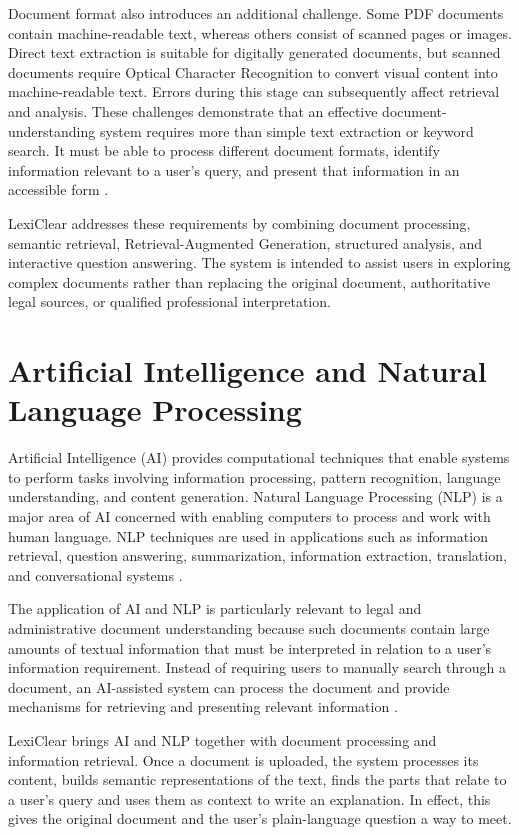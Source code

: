 \documentclass[12pt,a4paper,oneside]{report}
\begin{document}
Document format also introduces an additional challenge. Some PDF documents
contain machine-readable text, whereas others consist of scanned pages or
images. Direct text extraction is suitable for digitally generated
documents, but scanned documents require Optical Character Recognition to
convert visual content into machine-readable text. Errors during this stage
can subsequently affect retrieval and analysis. These challenges demonstrate that an effective document-understanding system
requires more than simple text extraction or keyword search. It must be able
to process different document formats, identify information relevant to a
user's query, and present that information in an accessible form \cite{pramanik2025}.

LexiClear addresses these requirements by combining document processing,
semantic retrieval, Retrieval-Augmented Generation, structured analysis, and
interactive question answering. The system is intended to assist users in exploring complex
documents rather than replacing the original document, authoritative legal
sources, or qualified professional interpretation.

\section{Artificial Intelligence and Natural Language Processing}

Artificial Intelligence (AI) provides computational techniques that enable
systems to perform tasks involving information processing, pattern
recognition, language understanding, and content generation. Natural Language
Processing (NLP) is a major area of AI concerned with enabling computers to
process and work with human language. NLP techniques are used in applications
such as information retrieval, question answering, summarization,
information extraction, translation, and conversational systems \cite{bommarito2018lexnlp}.

The application of AI and NLP is particularly relevant to legal and
administrative document understanding because such documents contain large
amounts of textual information that must be interpreted in relation to a
user's information requirement. Instead of requiring users to manually
search through a document, an AI-assisted system can process the document
and provide mechanisms for retrieving and presenting relevant information \cite{mahoney2019,bommarito2018lexnlp}.

LexiClear brings AI and NLP together with document processing and information retrieval. Once a document is uploaded, the system processes its content, builds semantic representations of the text, finds the parts that relate to a user's query and uses them as context to write an explanation. In effect, this gives the original document and the user's plain-language question a way to meet.
\end{document}

